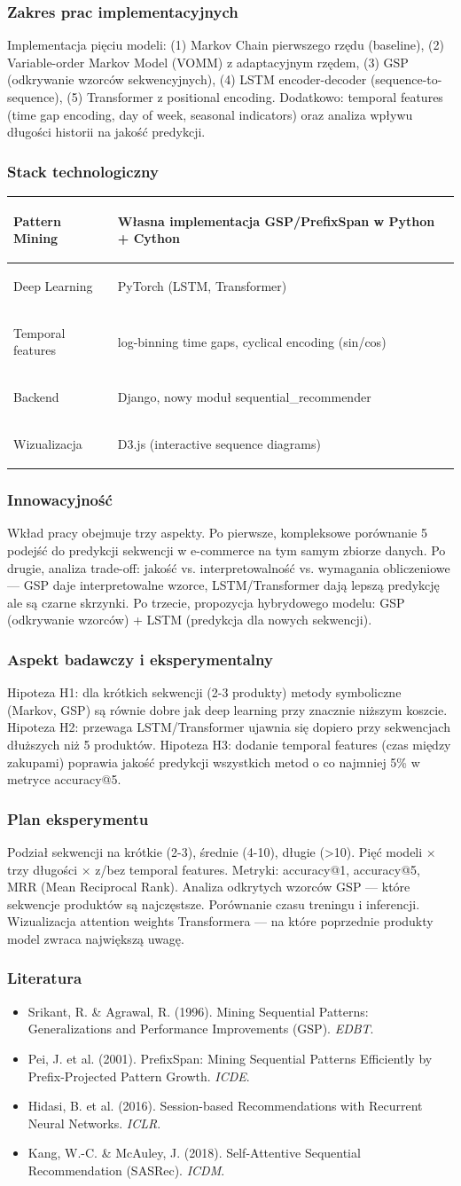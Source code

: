 \documentclass[12pt,a4paper]{article}
\newenvironment{stacktab}{%
    \arrayrulecolor{border}%
    \begin{tabular}{|>{\columncolor{lightbg}\bfseries\color{primary}\raggedright\arraybackslash}p{4.2cm}|>{\raggedright\arraybackslash}p{12cm}|}
    \hline
}{%
    \end{tabular}%
    \arrayrulecolor{black}%
}
\newcommand{\stackrow}[2]{#1 & #2 \\ \hline}
\newcommand{\topicsection}[1]{\subsubsection*{#1}}
\newenvironment{literatura}{%
    \topicsection{Literatura}
    \begin{itemize}[leftmargin=1.6em,labelsep=0.5em]
}{%
    \end{itemize}
}
\begin{document}
\topicsection{Zakres prac implementacyjnych}
Implementacja pięciu modeli: (1) Markov Chain pierwszego rzędu (baseline), (2) Variable-order Markov Model (VOMM) z adaptacyjnym rzędem, (3) GSP (odkrywanie wzorców sekwencyjnych), (4) LSTM encoder-decoder (sequence-to-sequence), (5) Transformer z positional encoding. Dodatkowo: temporal features (time gap encoding, day of week, seasonal indicators) oraz analiza wpływu długości historii na jakość predykcji.

\topicsection{Stack technologiczny}
\begin{stacktab}
\stackrow{Pattern Mining}{Własna implementacja GSP/PrefixSpan w Python + Cython}
\stackrow{Deep Learning}{PyTorch (LSTM, Transformer)}
\stackrow{Temporal features}{log-binning time gaps, cyclical encoding (sin/cos)}
\stackrow{Backend}{Django, nowy moduł sequential\_recommender}
\stackrow{Wizualizacja}{D3.js (interactive sequence diagrams)}
\end{stacktab}

\topicsection{Innowacyjność}
Wkład pracy obejmuje trzy aspekty. Po pierwsze, kompleksowe porównanie 5 podejść do predykcji sekwencji w e-commerce na tym samym zbiorze danych. Po drugie, analiza trade-off: jakość vs. interpretowalność vs. wymagania obliczeniowe --- GSP daje interpretowalne wzorce, LSTM/Transformer dają lepszą predykcję ale są czarne skrzynki. Po trzecie, propozycja hybrydowego modelu: GSP (odkrywanie wzorców) + LSTM (predykcja dla nowych sekwencji).

\topicsection{Aspekt badawczy i eksperymentalny}
Hipoteza H1: dla krótkich sekwencji (2-3 produkty) metody symboliczne (Markov, GSP) są równie dobre jak deep learning przy znacznie niższym koszcie. Hipoteza H2: przewaga LSTM/Transformer ujawnia się dopiero przy sekwencjach dłuższych niż 5 produktów. Hipoteza H3: dodanie temporal features (czas między zakupami) poprawia jakość predykcji wszystkich metod o co najmniej 5\% w metryce accuracy@5.

\topicsection{Plan eksperymentu}
Podział sekwencji na krótkie (2-3), średnie (4-10), długie (>10). Pięć modeli × trzy długości × z/bez temporal features. Metryki: accuracy@1, accuracy@5, MRR (Mean Reciprocal Rank). Analiza odkrytych wzorców GSP --- które sekwencje produktów są najczęstsze. Porównanie czasu treningu i inferencji. Wizualizacja attention weights Transformera --- na które poprzednie produkty model zwraca największą uwagę.

\begin{literatura}
\item Srikant, R. \& Agrawal, R. (1996). Mining Sequential Patterns: Generalizations and Performance Improvements (GSP). \textit{EDBT}.
\item Pei, J. et al. (2001). PrefixSpan: Mining Sequential Patterns Efficiently by Prefix-Projected Pattern Growth. \textit{ICDE}.
\item Hidasi, B. et al. (2016). Session-based Recommendations with Recurrent Neural Networks. \textit{ICLR}.
\item Kang, W.-C. \& McAuley, J. (2018). Self-Attentive Sequential Recommendation (SASRec). \textit{ICDM}.
\end{literatura}
\end{document}
